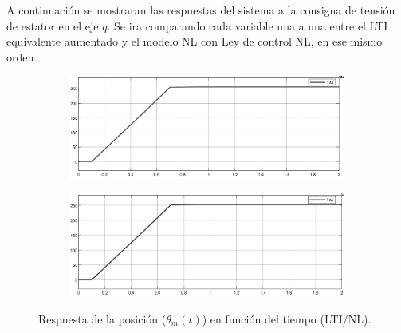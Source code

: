 \documentclass{article}
\begin{document}
A continuación se mostraran las respuestas del sistema a la consigna de tensión de estator en el eje $q$.
Se ira comparando cada variable una a una entre el LTI equivalente aumentado y el modelo NL con Ley de control NL, 
en ese mismo orden.

\begin{figure}[H]
    \centering
    \begin{subfigure}[b]{0.8\textwidth}
        \includegraphics[width=\textwidth]{5.1.6_tita.jpg}
    \end{subfigure}
    \begin{subfigure}[b]{0.8\textwidth}
        \includegraphics[width=1\textwidth]{5.1.6_tita_NL.jpg}
    \end{subfigure}
    \caption{Respuesta de la posición ($\theta_m(t)$) en función del tiempo (LTI/NL).}
    \label{fig:posicion}
\end{figure}
\end{document}

